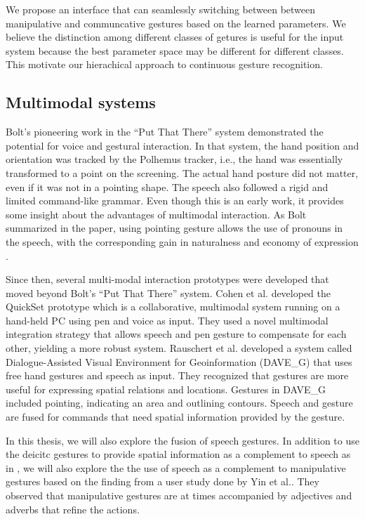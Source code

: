 We propose an interface that can seamlessly switching between between
manipulative and communcative gestures based on the learned parameters. We
believe the distinction among different classes of getures is useful for the
input system because the best parameter space may be different for different
classes. This motivate our hierachical approach to continuous gesture
recognition.

\subsection{Multimodal systems}
Bolt's pioneering work in the ``Put That There'' system \cite{Bolt80} 
demonstrated the potential for voice and gestural interaction.  In that system, 
the hand position and orientation was tracked by the Polhemus tracker, i.e., the
hand was essentially transformed to a point on the screening. The actual hand 
posture did not matter, even if it was not in a pointing shape. The speech also 
followed a rigid and limited command-like grammar. Even though this is an early 
work, it provides some insight about the advantages of multimodal interaction. 
As Bolt summarized in the paper, using pointing gesture allows the use of 
pronouns in the speech, with the corresponding gain in naturalness and economy 
of expression \cite{Bolt80}.

Since then, several multi-modal interaction prototypes were 
developed that moved beyond Bolt's ``Put That There'' system. Cohen et al. 
\cite{Cohen97} developed the QuickSet prototype which is a collaborative, 
multimodal system running on a hand-held PC using pen and voice as input. They 
used a novel multimodal integration strategy that allows speech and pen gesture 
to compensate for each other, yielding a more robust system. Rauschert et al. 
\cite{Rauschert02} developed a system called Dialogue-Assisted Visual 
Environment for Geoinformation (DAVE\_G) that uses free hand gestures and speech
as input. They recognized that gestures are more useful for expressing spatial 
relations and locations. Gestures in DAVE\_G included pointing, indicating an 
area and outlining contours. Speech and gesture are fused for commands that need
spatial information provided by the gesture. 

In this thesis, we will also explore the fusion of speech gestures. In addition
to use the deicitc gestures to provide spatial information as a complement to
speech as in \cite{Rauschert02}, we will also explore the the use of speech as a
complement to manipulative gestures based on the finding from a user study done
by Yin et al.\cite{yin10}. They observed that manipulative gestures are at times
accompanied by adjectives and adverbs that refine the actions.

